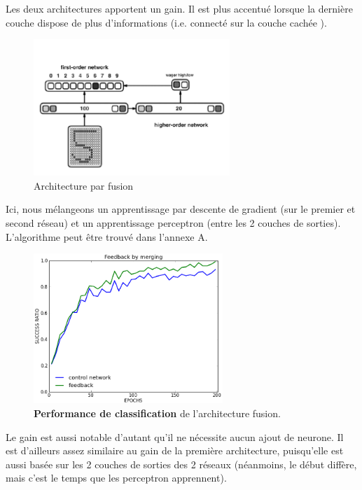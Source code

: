 \documentclass[a4paper,12pt, twoside]{article}
\begin{document}
Les deux architectures apportent un gain. Il est plus accentué lorsque la dernière couche dispose
de plus d'informations (i.e. connecté sur la couche cachée ).

\begin{figure}[H]
 \begin{center}
 \includegraphics[width=280px]{../pre-presentation/merging.png}
\end{center}
\caption{Architecture par fusion}
\end{figure}

Ici, nous mélangeons un apprentissage par descente de gradient (sur le premier et second réseau)
et un apprentissage perceptron (entre les 2 couches de sorties).
L'algorithme peut être trouvé dans l'annexe A.

\begin{figure}[H]
 \begin{center}
 \includegraphics[width=270px]{merging.png}
\end{center}
\caption{\textbf{Performance de classification} de l'architecture fusion.}
\end{figure}

Le gain est aussi notable d'autant qu'il ne nécessite aucun ajout de neurone.
Il est d'ailleurs assez similaire au gain de la première architecture, 
puisqu'elle est aussi basée sur les 2 couches de sorties des 2 réseaux
(néanmoins, le début diffère, mais c'est le temps que les perceptron apprennent).
\end{document}
